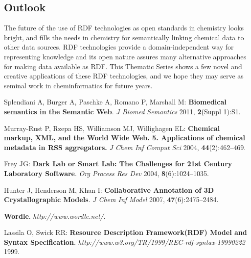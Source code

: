 \documentclass[10pt]{bmc_article}
\newenvironment{bmcformat}{\begin{raggedright}\baselineskip20pt\sloppy\setboolean{publ}{false}}{\end{raggedright}\baselineskip20pt\sloppy}
\begin{document}
\begin{bmcformat}
\section{Outlook}

The future of the use of RDF technologies as open standards in chemistry looks
bright, and fills the needs in chemistry for semantically linking
chemical data to other data sources. RDF technologies provide a
domain-independent way for representing knowledge and its open
nature assures many alternative approaches for making data available
as RDF.
This Thematic Series shows a few novel and creative applications of
these RDF technologies, and we hope they may serve as seminal work
in cheminformatics for future years.





\begin{thebibliography}{10}
\providecommand{\url}[1]{[#1]}
\providecommand{\urlprefix}{}

Splendiani A, Burger A, Paschke A, Romano P, Marshall M: \textbf{Biomedical
  semantics in the Semantic Web}. \emph{J Biomed Semantics} 2011,
  \textbf{2}(Suppl 1):S1.

Murray-Rust P, Rzepa HS, Williamson MJ, Willighagen EL: \textbf{Chemical
  markup, {XML}, and the World Wide Web. 5. Applications of chemical metadata
  in {RSS} aggregators.} \emph{J Chem Inf Comput Sci} 2004,
  \textbf{44}(2):462--469.

Frey JG: \textbf{Dark Lab or Smart Lab: The Challenges for 21st Century
  Laboratory Software}. \emph{Org Process Res Dev} 2004,
  \textbf{8}(6):1024--1035.

Hunter J, Henderson M, Khan I: \textbf{Collaborative Annotation of {3D}
  Crystallographic Models}. \emph{J Chem Inf Model} 2007,
  \textbf{47}(6):2475--2484.

\textbf{Wordle}. \emph{http://www.wordle.net/}.

Lassila O, Swick RR: \textbf{Resource Description {Framework(RDF}) Model and
  Syntax Specification}.
  \emph{http://www.w3.org/TR/1999/REC-rdf-syntax-19990222} 1999.


\end{thebibliography}
\end{bmcformat}
\end{document}
